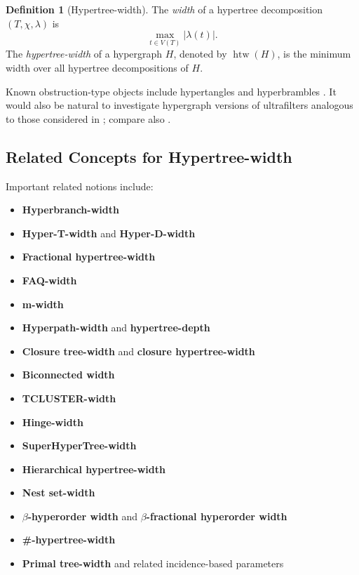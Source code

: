 \documentclass[10pt]{book}
\theoremstyle{definition}
\newtheorem{definition}[theorem]{Definition}
\begin{document}
\begin{definition}[Hypertree-width]
The \emph{width} of a hypertree decomposition \((T,\chi,\lambda)\) is
\[
\max_{t\in V(T)} |\lambda(t)|.
\]
The \emph{hypertree-width} of a hypergraph \(H\), denoted by \(\operatorname{htw}(H)\), is the minimum width over all hypertree decompositions of \(H\).
\end{definition}

Known obstruction-type objects include hypertangles and hyperbrambles \cite{250}.  
It would also be natural to investigate hypergraph versions of ultrafilters analogous to those considered in \cite{16}; compare also \cite{Malliaris2012HypergraphSA}.

\subsection{Related Concepts for Hypertree-width}
Important related notions include:

\begin{itemize}
    \item \textbf{Hyperbranch-width} \cite{250}
    \item \textbf{Hyper-T-width} and \textbf{Hyper-D-width} \cite{44}
    \item \textbf{Fractional hypertree-width} \cite{41}
    \item \textbf{FAQ-width} \cite{abo2016faq,khamis2015faq}
    \item \textbf{m-width} \cite{joglekar2015s}
    \item \textbf{Hyperpath-width} and \textbf{hypertree-depth} \cite{adler2012hypertree}
    \item \textbf{Closure tree-width} and \textbf{closure hypertree-width} \cite{adler2008tree}
    \item \textbf{Biconnected width} \cite{freuder1985sufficient}
    \item \textbf{TCLUSTER-width} \cite{dechter1989tree}
    \item \textbf{Hinge-width} \cite{gyssens1994decomposing}
    \item \textbf{SuperHyperTree-width}
    \cite{fujita2025shortclique,fujita2025superhyperbranch,
    smarandache2025superhypertopologies,
    FujitaSmarandache2026HyperGraphSuperHyperGraph}
    \item \textbf{Hierarchical hypertree-width} \cite{hu2022computing}
    \item \textbf{Nest set-width} \cite{lanzinger2023tractability}
    \item \textbf{\(\beta\)-hyperorder width} and \textbf{\(\beta\)-fractional hyperorder width} \cite{gottlob2004hypergraphs,capelli2023direct}
    \item \textbf{\#-hypertree-width} \cite{chen2023counting,greco2014counting}
    \item \textbf{Primal tree-width} and related incidence-based parameters \cite{arteche2022parameterized,ganian2021new}
\end{itemize}
\end{document}
